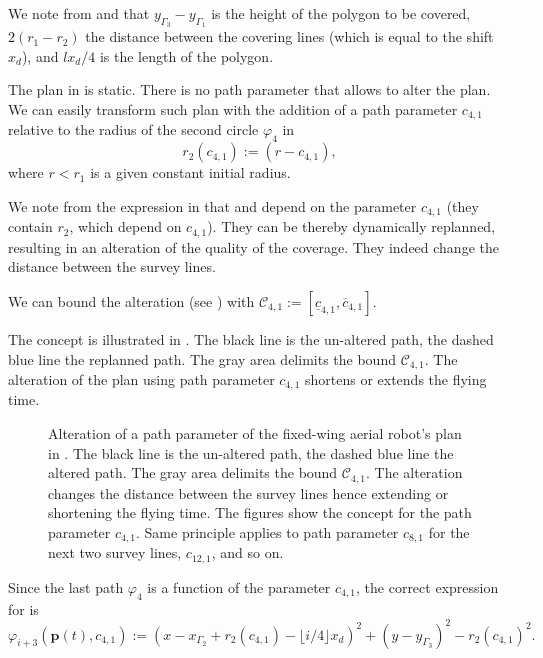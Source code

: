 We note from  and  that $y_{\Gamma_3}-y_{\Gamma_1}$ is the height of the polygon to be covered, $2(r_1-r_2)$ the distance between the covering lines (which is equal to the shift $x_d$), and $lx_d/4$ is the length of the polygon.

The plan in  is static. There is no path parameter that allows to alter the plan. We can easily transform such plan with the addition of a path parameter $c_{4,1}$ relative to the radius of the second circle $\varphi_4$ in 
\begin{equation}\label{eq:radius-dynamic}
  r_2(c_{4,1}):=(r-c_{4,1}),
\end{equation}
where $r<r_1$ is a given constant initial radius.

We note from the expression in  that  and  depend on the parameter $c_{4,1}$ (they contain $r_2$, which depend on $c_{4,1}$). They can be thereby dynamically replanned, resulting in an alteration of the quality of the coverage. They indeed change the distance between the survey lines.

We can bound the alteration (see ) with $\mathcal{C}_{4,1}:=[\underline{c}_{4,1},\overline{c}_{4,1}]$. 

The concept is illustrated in . The black line is the un-altered path, the dashed blue line the replanned path. The gray area delimits the bound $\mathcal{C}_{4,1}$. The alteration of the plan using path parameter $c_{4,1}$ shortens or extends the flying time.

\begin{figure}[p!]
  \centering
  
  \caption[Alteration of a path parameter of the fixed-wing aerial robot's plan]{Alteration of a path parameter of the fixed-wing aerial robot's plan in . The black line is the un-altered path, the dashed blue line the altered path. The gray area delimits the bound $\mathcal{C}_{4,1}$. The alteration changes the distance between the survey lines hence extending or shortening the flying time. The figures show the concept for the path parameter $c_{4,1}$. Same principle applies to path parameter $c_{8,1}$ for the next two survey lines, $c_{12,1}$, and so on.}
  \label{fig:plot5}
\end{figure}

Since the last path $\varphi_4$ is a function of the parameter $c_{4,1}$, the correct expression for  is 
\begin{equation}
  \varphi_{i+3}(\mathbf{p}(t),c_{4,1}):=(x-x_{\Gamma_2}+r_2(c_{4,1})-\lfloor i/4\rfloor x_d)^2+(y-y_{\Gamma_3})^2-r_2(c_{4,1})^2.
\end{equation}

